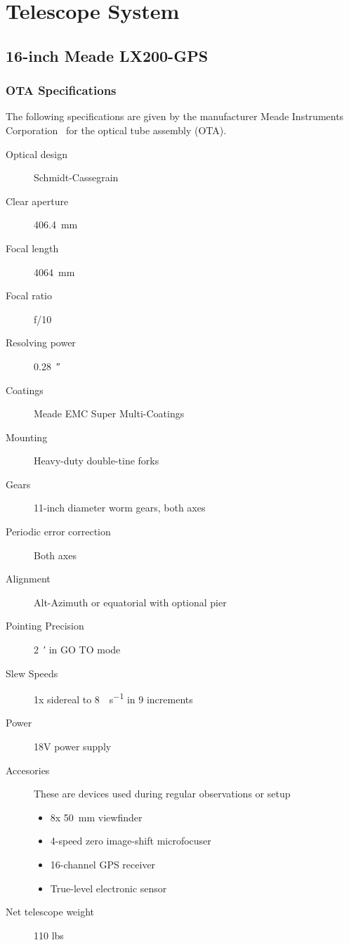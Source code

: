 \section{Telescope System}
\subsection{16-inch Meade LX200-GPS}
\subsubsection{OTA Specifications}
The following specifications are given by the manufacturer Meade Instruments Corporation~\cite{meade_2003} for the optical tube assembly (OTA).
\begin{description}
    \item[Optical design] Schmidt-Cassegrain
    \item[Clear aperture] \SI{406.4}{\milli\meter}
    \item[Focal length] \SI{4064}{\milli\meter}
    \item[Focal ratio] f/10
    \item[Resolving power] \SI{0.28}{\arcsecond}
    \item[Coatings] Meade EMC Super Multi-Coatings
    \item[Mounting] Heavy-duty double-tine forks
    \item[Gears] 11-inch diameter worm gears, both axes
    \item[Periodic error correction] Both axes
    \item[Alignment] Alt-Azimuth or equatorial with optional pier
    \item[Pointing Precision] \SI{2}{\arcminute} in GO TO mode
    \item[Slew Speeds] 1x sidereal to \SI{8}{\deg\per\second} in 9 increments
    \item[Power] 18V power supply
    \item[Accesories] These are devices used during regular observations or setup
        \begin{itemize}
            \item 8x \SI{50}{\milli\meter} viewfinder
            \item 4-speed zero image-shift microfocuser
            \item 16-channel GPS receiver
            \item True-level electronic sensor
        \end{itemize}
    \item[Net telescope weight] 110 lbs
\end{description}

